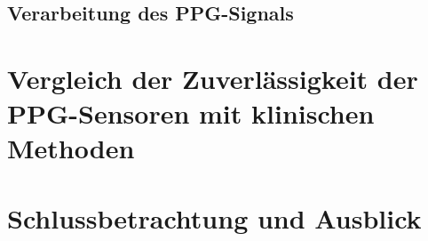 \documentclass[10pt,a4paper,headinclude,twoside, plainheadsepline, open=right, numbers=noenddot, twocolumn]{article}
\begin{document}
\subsection{Verarbeitung des PPG-Signals}
\label{verarbeitung des ppg-signals}

\section{Vergleich der Zuverlässigkeit der PPG-Sensoren mit klinischen Methoden}
\label{vergleich der verfahren}

\section{Schlussbetrachtung und Ausblick}
\label{schlussbetrachtung und ausblick}


%
\printbibliography
\end{document}
